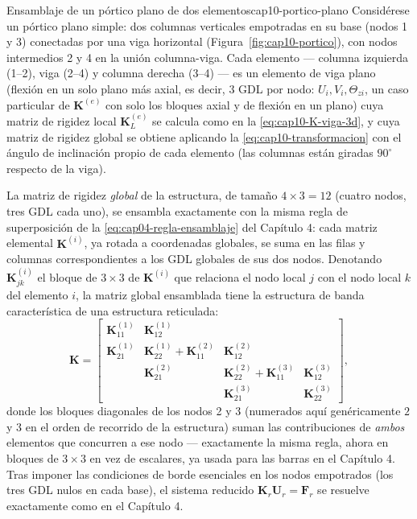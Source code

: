 \begin{ejemplo}{Ensamblaje de un pórtico plano de dos elementos}{cap10-portico-plano}
Considérese un pórtico plano simple: dos columnas verticales empotradas en su base (nodos 1 y 3) conectadas por una viga horizontal (Figura~\ref{fig:cap10-portico}), con nodos intermedios 2 y 4 en la unión columna-viga. Cada elemento --- columna izquierda (1--2), viga (2--4) y columna derecha (3--4) --- es un elemento de viga plano (flexión en un solo plano más axial, es decir, $3$ GDL por nodo: $U_i,V_i,\Theta_{zi}$, un caso particular de $\bm K^{(e)}$ con solo los bloques axial y de flexión en un plano) cuya matriz de rigidez local $\bm K_L^{(e)}$ se calcula como en la \cref{eq:cap10-K-viga-3d}, y cuya matriz de rigidez global se obtiene aplicando la \cref{eq:cap10-transformacion} con el ángulo de inclinación propio de cada elemento (las columnas están giradas $90^\circ$ respecto de la viga).

La matriz de rigidez \emph{global} de la estructura, de tamaño $4\times3=12$ (cuatro nodos, tres GDL cada uno), se ensambla exactamente con la misma regla de superposición de la \cref{eq:cap04-regla-ensamblaje} del Capítulo 4: cada matriz elemental $\bm K^{(i)}$, ya rotada a coordenadas globales, se suma en las filas y columnas correspondientes a los GDL globales de sus dos nodos. Denotando $\bm K^{(i)}_{jk}$ el bloque de $3\times3$ de $\bm K^{(i)}$ que relaciona el nodo local $j$ con el nodo local $k$ del elemento $i$, la matriz global ensamblada tiene la estructura de banda característica de una estructura reticulada:
\[
\bm K = \begin{bmatrix}
\bm K^{(1)}_{11} & \bm K^{(1)}_{12} & & \\
\bm K^{(1)}_{21} & \bm K^{(1)}_{22}+\bm K^{(2)}_{11} & \bm K^{(2)}_{12} & \\
& \bm K^{(2)}_{21} & \bm K^{(2)}_{22}+\bm K^{(3)}_{11} & \bm K^{(3)}_{12} \\
& & \bm K^{(3)}_{21} & \bm K^{(3)}_{22}
\end{bmatrix} ,
\]
donde los bloques diagonales de los nodos 2 y 3 (numerados aquí genéricamente $2$ y $3$ en el orden de recorrido de la estructura) suman las contribuciones de \emph{ambos} elementos que concurren a ese nodo --- exactamente la misma regla, ahora en bloques de $3\times3$ en vez de escalares, ya usada para las barras en el Capítulo 4. Tras imponer las condiciones de borde esenciales en los nodos empotrados (los tres GDL nulos en cada base), el sistema reducido $\bm K_r\bm U_r=\bm F_r$ se resuelve exactamente como en el Capítulo 4.
\end{ejemplo}


